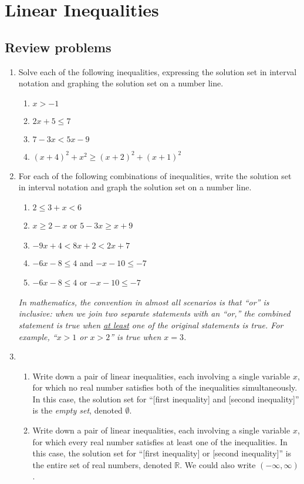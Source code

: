 \section{Linear Inequalities}

\subsection{Review problems}

\begin{enumerate}
\item Solve each of the following inequalities, expressing the solution set in interval notation and graphing the solution set on a number line.
\begin{enumerate}
\item $x > -1$
\item $2x + 5\leq 7$
\item $7 - 3x < 5x - 9$
\item $(x + 4)^2 + x^2\geq (x + 2)^2 + (x + 1)^2$
\end{enumerate}
\item For each of the following combinations of inequalities, write the solution set in interval notation and graph the solution set on a number line.
\begin{enumerate}
\item $2\leq 3 + x < 6$
\item $x\geq 2 - x$ or $5 - 3x\geq x + 9$
\item $-9x + 4 < 8x + 2 < 2x + 7$
\item $-6x - 8\leq 4$ and $-x - 10\leq -7$
\item $-6x - 8\leq 4$ or $-x - 10\leq -7$
\end{enumerate}
\emph{In mathematics, the convention in almost all scenarios is that ``or'' is inclusive: when we join two separate statements with an ``or,'' the combined statement is true when \underline{at least} one of the original statements is true. For example, ``$x > 1$ or $x > 2$'' is true when $x = 3$.}
\item \begin{enumerate}
\item Write down a pair of linear inequalities, each involving a single variable $x$, for which no real number satisfies both of the inequalities simultaneously. In this case, the solution set for ``[first inequality] and [second inequality]'' is the \emph{empty set}, denoted $\emptyset$.
\item Write down a pair of linear inequalities, each involving a single variable $x$, for which every real number satisfies at least one of the inequalities. In this case, the solution set for ``[first inequality] or [second inequality]'' is the entire set of real numbers, denoted $\mathbb{R}$. We could also write $(-\infty, \infty)$.

\end{enumerate}
\end{enumerate}
